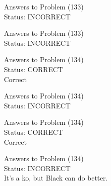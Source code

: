 \documentclass[11pt]{article}
\begin{document}
\begin{minipage}[t]{0.5\textwidth}
  {\centering
  
  Answers to Problem (133)\\
  Status: INCORRECT\\
  
  }
\end{minipage}
\begin{minipage}[t]{0.5\textwidth}
  {\centering
  
  Answers to Problem (133)\\
  Status: INCORRECT\\
  
  }
\end{minipage}
\begin{minipage}[t]{0.5\textwidth}
  {\centering
  
  Answers to Problem (134)\\
  Status: CORRECT\\
  Correct\\
  }
\end{minipage}
\begin{minipage}[t]{0.5\textwidth}
  {\centering
  
  Answers to Problem (134)\\
  Status: INCORRECT\\
  
  }
\end{minipage}
\begin{minipage}[t]{0.5\textwidth}
  {\centering
  
  Answers to Problem (134)\\
  Status: CORRECT\\
  Correct\\
  }
\end{minipage}
\begin{minipage}[t]{0.5\textwidth}
  {\centering
  
  Answers to Problem (134)\\
  Status: INCORRECT\\
  It's a ko, but Black can do better.\\
  }
\end{minipage}
\end{document}
